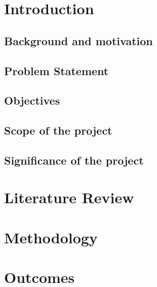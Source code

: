 \documentclass[11pt]{report}
\begin{document}
    \chapter{Introduction}\label{ch:introduction}


    \section{Background and motivation}\label{sec:background-and-motivation}
    

    \section{Problem Statement}\label{sec:problem-statement}
    

    \section{Objectives}\label{sec:objectives}
    

    \section{Scope of the project}\label{sec:scope-of-the-project}
    

    \section{Significance of the project}\label{sec:significance-of-the-project}
    

    \chapter{Literature Review}\label{ch:literature-review}
    

    \chapter{Methodology}\label{ch:methodology}
    

    \chapter{Outcomes}\label{ch:outcomes}
    
\end{document}
